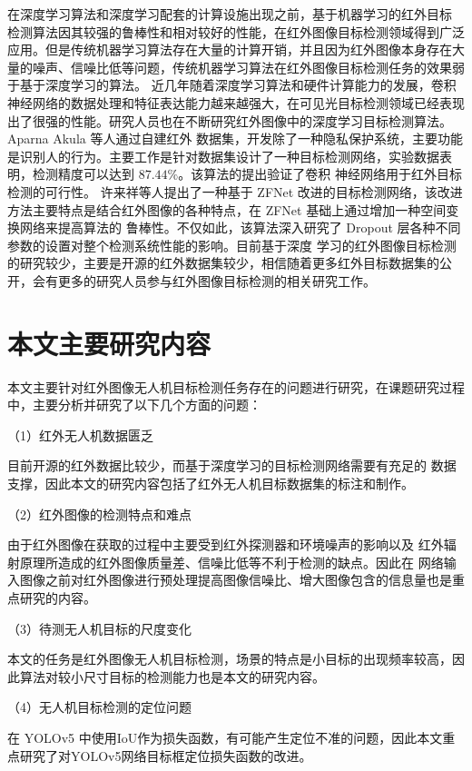 在深度学习算法和深度学习配套的计算设施出现之前，基于机器学习的红外目标
检测算法因其较强的鲁棒性和相对较好的性能，在红外图像目标检测领域得到广泛应用。但是传统机器学习算法存在大量的计算开销，并且因为红外图像本身存在大量的噪声、信噪比低等问题，传统机器学习算法在红外图像目标检测任务的效果弱于基于深度学习的算法。
近几年随着深度学习算法和硬件计算能力的发展，卷积神经网络的数据处理和特征表达能力越来越强大，在可见光目标检测领域已经表现出了很强的性能。研究人员也在不断研究红外图像中的深度学习目标检测算法。
Aparna
Akula 等人通过自建红外
数据集，开发除了一种隐私保护系统，主要功能是识别人的行为。主要工作是针对数据集设计了一种目标检测网络，实验数据表明，检测精度可以达到 $87.44\%$。该算法的提出验证了卷积
神经网络用于红外目标检测的可行性\cite{akula2018deep}。
许来祥等人提出了一种基于 ZFNet 改进的目标检测网络，该改进方法主要特点是结合红外图像的各种特点，在 ZFNet 基础上通过增加一种空间变换网络来提高算法的
鲁棒性。不仅如此，该算法深入研究了 Dropout 层各种不同参数的设置对整个检测系统性能的影响\cite{许来祥2020基于改进}。目前基于深度
学习的红外图像目标检测的研究较少，主要是开源的红外数据集较少，相信随着更多红外目标数据集的公开，会有更多的研究人员参与红外图像目标检测的相关研究工作。

\section{本文主要研究内容}
本文主要针对红外图像无人机目标检测任务存在的问题进行研究，在课题研究过程中，主要分析并研究了以下几个方面的问题：

（1）红外无人机数据匮乏

目前开源的红外数据比较少，而基于深度学习的目标检测网络需要有充足的
数据支撑，因此本文的研究内容包括了红外无人机目标数据集的标注和制作。

（2）红外图像的检测特点和难点

由于红外图像在获取的过程中主要受到红外探测器和环境噪声的影响以及
红外辐射原理所造成的红外图像质量差、信噪比低等不利于检测的缺点。因此在
网络输入图像之前对红外图像进行预处理提高图像信噪比、增大图像包含的信息量也是重点研究的内容。

（3）待测无人机目标的尺度变化

本文的任务是红外图像无人机目标检测，场景的特点是小目标的出现频率较高，因此算法对较小尺寸目标的检测能力也是本文的研究内容。

（4）无人机目标检测的定位问题

在 YOLOv5 中使用IoU作为损失函数，有可能产生定位不准的问题，因此本文重点研究了对YOLOv5网络目标框定位损失函数的改进。

